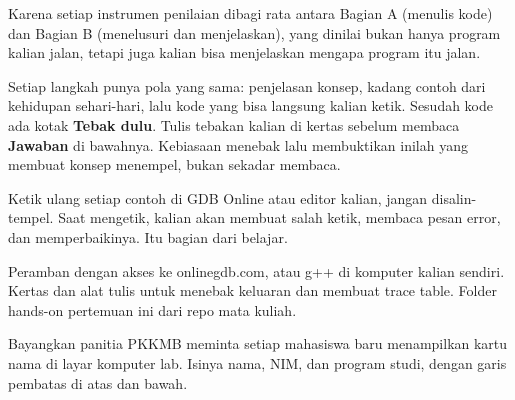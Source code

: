 \documentclass[a4paper]{article}
\begin{document}
\par\vspace{4pt}\par\vspace{6pt}
Karena setiap instrumen penilaian dibagi rata antara Bagian A (menulis kode) dan Bagian B (menelusuri dan menjelaskan), yang dinilai bukan hanya program kalian jalan, tetapi juga kalian bisa menjelaskan mengapa program itu jalan.

Setiap langkah punya pola yang sama: penjelasan konsep, kadang contoh dari kehidupan sehari-hari, lalu kode yang bisa langsung kalian ketik. Sesudah kode ada kotak \textbf{Tebak dulu}. Tulis tebakan kalian di kertas sebelum membaca \textbf{Jawaban} di bawahnya. Kebiasaan menebak lalu membuktikan inilah yang membuat konsep menempel, bukan sekadar membaca.

\begin{Penting}
Ketik ulang setiap contoh di GDB Online atau editor kalian, jangan disalin-tempel. Saat mengetik, kalian akan membuat salah ketik, membaca pesan error, dan memperbaikinya. Itu bagian dari belajar.
\end{Penting}
Peramban dengan akses ke onlinegdb.com, atau g++ di komputer kalian sendiri. Kertas dan alat tulis untuk menebak keluaran dan membuat trace table. Folder hands-on pertemuan ini dari repo mata kuliah.

Bayangkan panitia PKKMB meminta setiap mahasiswa baru menampilkan kartu nama di layar komputer lab. Isinya nama, NIM, dan program studi, dengan garis pembatas di atas dan bawah.
\end{document}
